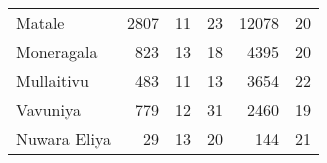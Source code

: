 \begin{tabular}{lrrrrr}
Matale       &        2807 &          11 &           23 &            12078 &          20 \\
Moneragala   &         823 &          13 &           18 &             4395 &          20 \\
Mullaitivu   &         483 &          11 &           13 &             3654 &          22 \\
Vavuniya     &         779 &          12 &           31 &             2460 &          19 \\
Nuwara Eliya &          29 &          13 &           20 &              144 &          21 \\
\bottomrule
\end{tabular}
